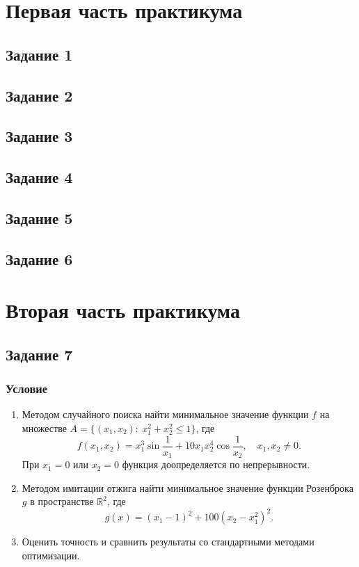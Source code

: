 \documentclass[11pt]{report}
\begin{document}
\tableofcontents

\newpage %

\chapter{Первая часть практикума}

\section{Задание 1}

\section{Задание 2}

\section{Задание 3}

\section{Задание 4}

\section{Задание 5}

\section{Задание 6}

\chapter{Вторая часть практикума}

\section{Задание 7}

\subsection{Условие}

\begin{enumerate}
\item Методом случайного поиска найти минимальное значение функции $f$ на множестве $A = \{(x_1,x_2):~x_1^2+x_2^2\leqslant 1\}$, где
$$
f(x_1,x_2) = x_1^3\sin\frac{1}{x_1} + 10x_1x_2^4\cos\frac{1}{x_2},\quad x_1,x_2\neq0.
$$
При $x_1=0$ или $x_2=0$ функция доопределяется по непрерывности.

\item Методом имитации отжига найти минимальное значение функции Розенброка $g$ в пространстве $\mathbb{R}^2$, где
$$
g(x) = (x_1-1)^2 + 100(x_2-x_1^2)^2.
$$

\item Оценить точность и сравнить результаты со стандартными методами оптимизации.
\end{enumerate}
\end{document}
